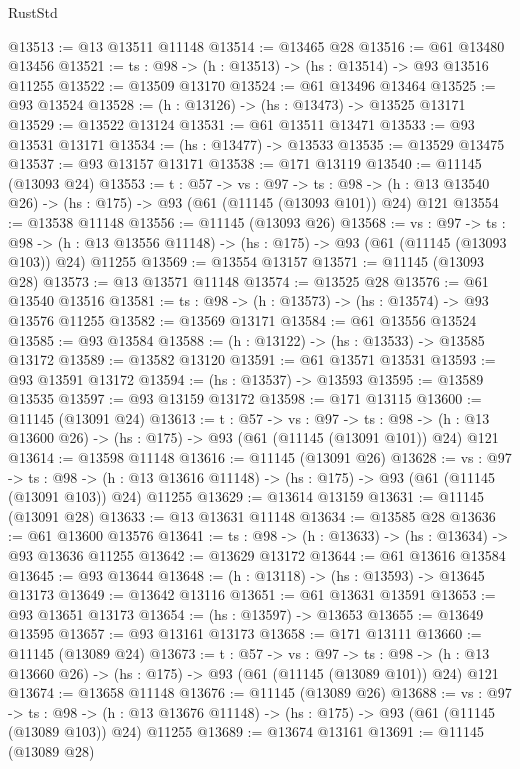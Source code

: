 \begin{lexlean}{RustStd}
\begin{coremodule}
@13513 := @13 @13511 @11148
@13514 := @13465 @28
@13516 := @61 @13480 @13456
@13521 := {ts : @98} -> (h : @13513) -> (hs : @13514) -> @93 @13516 @11255
@13522 := @13509 @13170
@13524 := @61 @13496 @13464
@13525 := @93 @13524
@13528 := (h : @13126) -> (hs : @13473) -> @13525 @13171
@13529 := @13522 @13124
@13531 := @61 @13511 @13471
@13533 := @93 @13531 @13171
@13534 := (hs : @13477) -> @13533
@13535 := @13529 @13475
@13537 := @93 @13157 @13171
@13538 := @171 @13119
@13540 := @11145 (@13093 @24)
@13553 := {t : @57} ->
  {vs : @97} ->
  {ts : @98} -> (h : @13 @13540 @26) -> (hs : @175) -> @93 (@61 (@11145 (@13093 @101)) @24) @121
@13554 := @13538 @11148
@13556 := @11145 (@13093 @26)
@13568 := {vs : @97} ->
  {ts : @98} ->
  (h : @13 @13556 @11148) -> (hs : @175) -> @93 (@61 (@11145 (@13093 @103)) @24) @11255
@13569 := @13554 @13157
@13571 := @11145 (@13093 @28)
@13573 := @13 @13571 @11148
@13574 := @13525 @28
@13576 := @61 @13540 @13516
@13581 := {ts : @98} -> (h : @13573) -> (hs : @13574) -> @93 @13576 @11255
@13582 := @13569 @13171
@13584 := @61 @13556 @13524
@13585 := @93 @13584
@13588 := (h : @13122) -> (hs : @13533) -> @13585 @13172
@13589 := @13582 @13120
@13591 := @61 @13571 @13531
@13593 := @93 @13591 @13172
@13594 := (hs : @13537) -> @13593
@13595 := @13589 @13535
@13597 := @93 @13159 @13172
@13598 := @171 @13115
@13600 := @11145 (@13091 @24)
@13613 := {t : @57} ->
  {vs : @97} ->
  {ts : @98} -> (h : @13 @13600 @26) -> (hs : @175) -> @93 (@61 (@11145 (@13091 @101)) @24) @121
@13614 := @13598 @11148
@13616 := @11145 (@13091 @26)
@13628 := {vs : @97} ->
  {ts : @98} ->
  (h : @13 @13616 @11148) -> (hs : @175) -> @93 (@61 (@11145 (@13091 @103)) @24) @11255
@13629 := @13614 @13159
@13631 := @11145 (@13091 @28)
@13633 := @13 @13631 @11148
@13634 := @13585 @28
@13636 := @61 @13600 @13576
@13641 := {ts : @98} -> (h : @13633) -> (hs : @13634) -> @93 @13636 @11255
@13642 := @13629 @13172
@13644 := @61 @13616 @13584
@13645 := @93 @13644
@13648 := (h : @13118) -> (hs : @13593) -> @13645 @13173
@13649 := @13642 @13116
@13651 := @61 @13631 @13591
@13653 := @93 @13651 @13173
@13654 := (hs : @13597) -> @13653
@13655 := @13649 @13595
@13657 := @93 @13161 @13173
@13658 := @171 @13111
@13660 := @11145 (@13089 @24)
@13673 := {t : @57} ->
  {vs : @97} ->
  {ts : @98} -> (h : @13 @13660 @26) -> (hs : @175) -> @93 (@61 (@11145 (@13089 @101)) @24) @121
@13674 := @13658 @11148
@13676 := @11145 (@13089 @26)
@13688 := {vs : @97} ->
  {ts : @98} ->
  (h : @13 @13676 @11148) -> (hs : @175) -> @93 (@61 (@11145 (@13089 @103)) @24) @11255
@13689 := @13674 @13161
@13691 := @11145 (@13089 @28)

\end{coremodule}
\end{lexlean}
